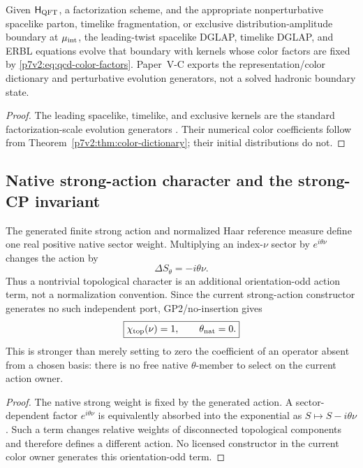\documentclass[12pt,a4paper]{article}
\newcommand{\Hqft}{\mathsf{H}_{\rm QFT}}
\begin{document}
\begin{proposition}
\label{p7v2:prop:dglap-erbl}
Given \(\Hqft\), a factorization scheme, and the appropriate nonperturbative
spacelike parton, timelike fragmentation, or exclusive distribution-amplitude
boundary at \(\mu_{\rm int}\), the leading-twist spacelike DGLAP, timelike
DGLAP, and ERBL equations evolve that boundary with kernels whose color
factors are fixed by \eqref{p7v2:eq:qcd-color-factors}.  Paper~V-C exports the
representation/color dictionary and perturbative evolution generators, not a
solved hadronic boundary state.
\end{proposition}

\begin{proof}
The leading spacelike, timelike, and exclusive kernels are the standard
factorization-scale evolution generators
\cite{GribovLipatov1972,Dokshitzer1977,AltarelliParisi1977}.  Their numerical
color coefficients follow from
Theorem~\ref{p7v2:thm:color-dictionary}; their initial distributions do not.
\end{proof}

\subsection{Native strong-action character and the strong-CP invariant}
\label{p7v2:sec:strong-cp}

\begin{theorem}
\label{p7v2:thm:bare-theta}
The generated finite strong action and normalized Haar reference measure define
one real positive native sector weight.  Multiplying an index-\(\nu\) sector
by \(e^{i\theta\nu}\) changes the action by
\[
 \Delta S_\theta=-i\theta\nu.
\]
Thus a nontrivial topological character is an additional orientation-odd
action term, not a normalization convention.  Since the current strong-action
constructor generates no such independent port, GP2/no-insertion gives
\begin{equation}
\label{p7v2:eq:bare-theta-zero}
 \boxed{\chi_{\rm top}(\nu)=1,\qquad \theta_{\rm nat}=0.}
\end{equation}
This is stronger than merely setting to zero the coefficient of an operator
absent from a chosen basis: there is no free native \(\theta\)-member to
select on the current action owner.
\end{theorem}
\begin{proof}
The native strong weight is fixed by the generated action.  A sector-dependent
factor \(e^{i\theta\nu}\) is equivalently absorbed into the exponential as
\(S\mapsto S-i\theta\nu\).  Such a term changes relative weights of disconnected
topological components and therefore defines a different action.  No licensed
constructor in the current color owner generates this orientation-odd term.
\end{proof}
\end{document}
